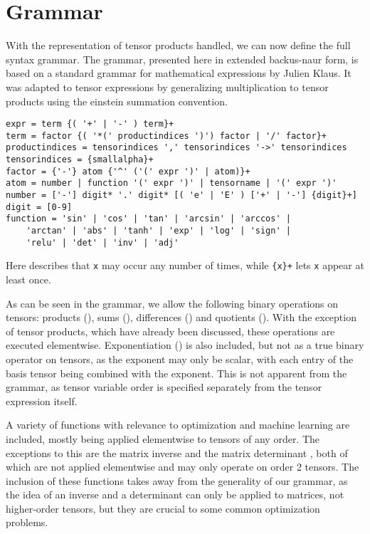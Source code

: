 \documentclass[12pt, a4paper]{report}
\begin{document}
\section{Grammar}
With the representation of tensor products handled, we can now define the full syntax grammar.
The grammar, presented here in extended backus-naur form, is based on a standard grammar for mathematical expressions by Julien Klaus.
It was adapted to tensor expressions by generalizing multiplication to tensor products using the einstein summation convention.
\begin{verbatim}
expr = term {( '+' | '-' ) term}+
term = factor {( '*(' productindices ')') factor | '/' factor}+
productindices = tensorindices ',' tensorindices '->' tensorindices
tensorindices = {smallalpha}+
factor = {'-'} atom {'^' ('(' expr ')' | atom)}+
atom = number | function '(' expr ')' | tensorname | '(' expr ')'
number = ['-'] digit* '.' digit* [( 'e' | 'E' ) ['+' | '-'] {digit}+]
digit = [0-9]
function = 'sin' | 'cos' | 'tan' | 'arcsin' | 'arccos' | 
    'arctan' | 'abs' | 'tanh' | 'exp' | 'log' | 'sign' | 
    'relu' | 'det' | 'inv' | 'adj'
\end{verbatim}
Here \texttt{} describes that \texttt{x} may occur any number of times, while \texttt{\{x\}+} lets \texttt{x} appear at least once.

As can be seen in the grammar, we allow the following binary operations on tensors: products (\codeword{*(,->)}), sums (\codeword{+}), differences (\codeword{-}) and quotients (\codeword{/}).
With the exception of tensor products, which have already been discussed, these operations are executed elementwise.
Exponentiation (\codeword{^}) is also included, but not as a true binary operator on tensors, as the exponent may only be scalar, with each entry of the basis tensor being combined with the exponent.
This is not apparent from the grammar, as tensor variable order is specified separately from the tensor expression itself.

A variety of functions with relevance to optimization and machine learning are included, mostly being applied elementwise to tensors of any order.
The exceptions to this are the matrix inverse  and the matrix determinant , both of which are not applied elementwise and may only operate on order 2 tensors.
The inclusion of these functions takes away from the generality of our grammar, as the idea of an inverse and a determinant can only be applied to matrices, not higher-order tensors, but they are crucial to some common optimization problems.
\end{document}
